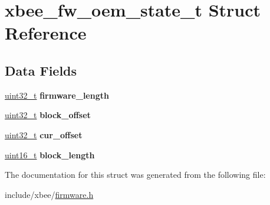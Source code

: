 \hypertarget{structxbee__fw__oem__state__t}{\section{xbee\-\_\-fw\-\_\-oem\-\_\-state\-\_\-t Struct Reference}
\label{structxbee__fw__oem__state__t}
}
\subsection*{Data Fields}
\begin{DoxyCompactItemize}
\item 
\hypertarget{group__xbee__firmware_gaaf993ea8576712b7e3f946ee716a1aa3}{\hyperlink{group__hal__dos_ga09a1e304d66d35dd47daffee9731edaa}{uint32\-\_\-t} {\bfseries firmware\-\_\-length}}\label{group__xbee__firmware_gaaf993ea8576712b7e3f946ee716a1aa3}

\item 
\hypertarget{group__xbee__firmware_gaf563348d7d0afde1c7df0262979e78c5}{\hyperlink{group__hal__dos_ga09a1e304d66d35dd47daffee9731edaa}{uint32\-\_\-t} {\bfseries block\-\_\-offset}}\label{group__xbee__firmware_gaf563348d7d0afde1c7df0262979e78c5}

\item 
\hypertarget{group__xbee__firmware_gaaff24a22c5321fbbc3715b1642e1bd26}{\hyperlink{group__hal__dos_ga09a1e304d66d35dd47daffee9731edaa}{uint32\-\_\-t} {\bfseries cur\-\_\-offset}}\label{group__xbee__firmware_gaaff24a22c5321fbbc3715b1642e1bd26}

\item 
\hypertarget{group__xbee__firmware_ga697415db67a165624b2b440418635e68}{\hyperlink{group__hal_ga5a8b2dc9e45a9ee81a94ef304fb62505}{uint16\-\_\-t} {\bfseries block\-\_\-length}}\label{group__xbee__firmware_ga697415db67a165624b2b440418635e68}

\end{DoxyCompactItemize}


The documentation for this struct was generated from the following file\-:\begin{DoxyCompactItemize}
\item 
include/xbee/\hyperlink{firmware_8h}{firmware.\-h}\end{DoxyCompactItemize}
